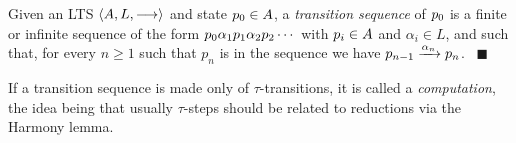 


 \begin{definition}%
   \label{def:inf-transition-sequence}
   Given an LTS  $\langle  A ,  L ,  \mathrel{\overset{}\longrightarrow}  \rangle$ and state $p_0 \in
  A$, a \emph{transition sequence} of $p_0$ is a finite or infinite
  sequence of the form $p_0 \alpha_1 p_1 \alpha_2
  p_2 \cdots$ with $p_i \in A$ and $\alpha_i \in L$, and
  such that, for every $n \geq 1$ such that $p_n$ is in the sequence we have
  $p_{n-1} \xrightarrow{\alpha_n} p_{n}$.
~\hfill$\blacksquare$
 \end{definition}
 \noindent
 If a transition sequence %
 is made only of  $\tau$-transitions,
 it is called a {\em computation}, the idea being that
 usually $\tau$-steps should be related to reductions via the Harmony
 lemma.

